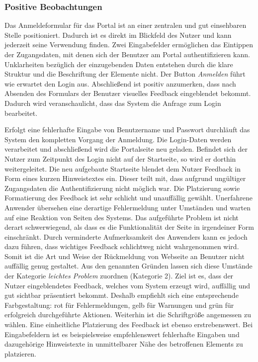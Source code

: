 
\subsubsection*{Positive Beobachtungen}
Das Anmeldeformular für das Portal ist an einer zentralen und gut einsehbaren Stelle positioniert. Dadurch ist es direkt im Blickfeld des Nutzer und kann jederzeit seine Verwendung finden. Zwei Eingabefelder ermöglichen das Eintippen der Zugangsdaten, mit denen sich der Benutzer am Portal authentifizieren kann. Unklarheiten bezüglich der einzugebenden Daten entstehen durch die klare Struktur und die Beschriftung der Elemente nicht. Der Button \emph{Anmelden} führt wie erwartet den Login aus. Abschließend ist positiv anzumerken, dass nach Absenden des Formulars der Benutzer visuelles Feedback eingeblendet bekommt. Dadurch wird veranschaulicht, dass das System die Anfrage zum Login bearbeitet.

{
	Erfolgt eine fehlerhafte Eingabe von Benutzername und Passwort durchläuft das System den kompletten Vorgang der Anmeldung. Die Login-Daten werden verarbeitet und abschließend wird die Portalseite neu geladen. Befindet sich der Nutzer zum Zeitpunkt des Login nicht auf der Startseite, so wird er dorthin weitergeleitet. Die neu aufgebaute Startseite blendet dem Nutzer Feedback in Form eines kurzen Hinweistextes ein. Dieser teilt mit, dass aufgrund ungültiger Zugangsdaten die Authentifizierung nicht möglich war. Die Platzierung sowie Formatierung des Feedback ist sehr schlicht und unauffällig gewählt. Unerfahrene Anwender übersehen eine derartige Fehlermeldung unter Umständen und warten auf eine Reaktion von Seiten des Systems.
}
{
	Das aufgeführte Problem ist nicht derart schwerwiegend, als dass es die Funktionalität der Seite in irgendeiner Form einschränkt. Durch verminderte Aufmerksamkeit des Anwenders kann es jedoch dazu führen, dass wichtiges Feedback schlichtweg nicht wahrgenommen wird. Somit ist die Art und Weise der Rückmeldung von Webseite an Benutzer nicht auffällig genug gestaltet. Aus den genannten Gründen lassen sich diese Umstände der Kategorie \emph{leichtes Problem} zuordnen (Kategorie 2).		
}
{
	Ziel ist es, dass der Nutzer eingeblendetes Feedback, welches vom System erzeugt wird, auffällig und gut sichtbar präsentiert bekommt. Deshalb empfiehlt sich eine entsprechende Farbgestaltung: rot für Fehlermeldungen, gelb für Warnungen und grün für erfolgreich durchgeführte Aktionen. Weiterhin ist die Schriftgröße angemessen zu wählen. Eine einheitliche Platzierung des Feedback ist ebenso erstrebenswert. Bei Eingabefeldern ist es beispielsweise empfehlenswert fehlerhafte Eingaben und dazugehörige Hinweistexte in unmittelbarer Nähe des betroffenen Elements zu platzieren.
}


